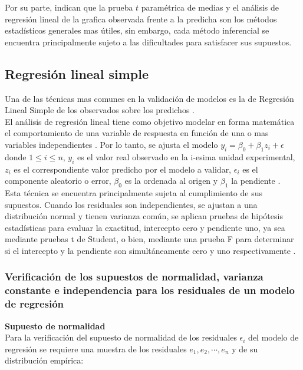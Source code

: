 Por su parte, \textcite{mayer-butler-1993} indican que la prueba $t$ paramétrica de medias y el análisis de regresión lineal de la grafica observada frente a la predicha son los métodos estadísticos generales mas útiles, sin embargo, cada método inferencial se encuentra principalmente sujeto a las dificultades para satisfacer sus supuestos.\\



\subsection{Regresión lineal simple}
Una de las técnicas mas comunes en la validación de modelos es la de Regresión Lineal Simple de los observados sobre los predichos \parencites{analla-1998, mayer-1994, tedeschi-2006}.\\

El análisis de regresión lineal tiene como objetivo modelar en forma matemática el comportamiento de una variable de respuesta en función de una o mas variables independientes \parencite{gutierrez-2012}. Por lo tanto, se ajusta el modelo  $ y_{i} = \beta_{0} + \beta_{1}z_{i} +\epsilon $ donde $ 1 \leq i \leq n$, $ y_{i}$ es el valor real observado en la i-esima unidad experimental, $ z_{i}$ es el correspondiente valor predicho por el modelo a validar, $\epsilon_{i}$ es el componente aleatorio o error, $\beta_{0}$ es la ordenada al origen y $\beta_{1}$ la pendiente \parencite{zacarias-2023}.\\

Esta técnica se encuentra principalmente sujeta al cumplimiento de sus supuestos. Cuando los residuales son independientes, se ajustan a una distribución normal y tienen varianza común, se aplican pruebas de hipótesis estadísticas para evaluar la exactitud, intercepto cero y pendiente uno, ya sea mediante pruebas t de Student, o bien, mediante una prueba F para determinar si el intercepto y la pendiente son simultáneamente cero y uno respectivamente \parencite{balam-2012}.


\subsubsection{Verificación de los supuestos de normalidad, varianza constante e independencia para los residuales de un modelo de regresión}


\textbf{Supuesto de normalidad}\\

Para la verificación del supuesto de normalidad de los residuales $\epsilon_i$ del modelo de regresión se requiere una muestra de los residuales $e_1, e_2, \cdots, e_n$ y de su distribución empírica:\\


